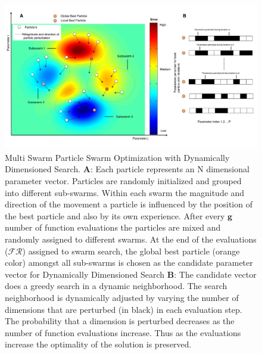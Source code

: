 \documentclass[12pt]{article}
\begin{document}
\clearpage

\begin{figure}[h]
\centering
\includegraphics[width=1.0\textwidth,height=0.5\textheight]{./figs/Figure_1_Algorithm.pdf}
\caption{Multi Swarm Particle Swarm Optimization with Dynamically Dimensioned Search. \textbf{A}: Each particle represents an N dimensional parameter vector. Particles are randomly initialized and grouped into different sub-swarms. Within each swarm the magnitude and direction of the movement a particle is influenced by the position of the best particle and also by its own experience. After every $\mathbf{g}$ number of function evaluations the particles are mixed and randomly assigned to different swarms. At the end of the evaluations ($\mathcal{FR}$) assigned to swarm search, the global best particle (orange color) amongst all sub-swarms is chosen as the candidate parameter vector for Dynamically Dimensioned Search \textbf{B}: The candidate vector does a greedy search in a dynamic neighborhood. The search neighborhood is dynamically adjusted by varying the number of dimensions that are perturbed (in black) in each evaluation step. The probability that a dimension is perturbed decreases as the number of function evaluations increase. Thus as the evaluations increase the optimality of the solution is preserved.
}\label{fig-algorithm}
\end{figure}

\clearpage
\end{document}
